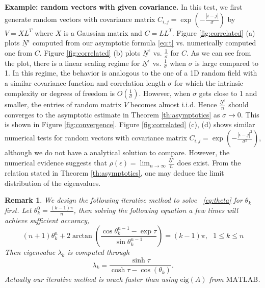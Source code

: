 \documentclass[11pt]{amsart}
\newtheorem{remark}{Remark}[section]
\newcommand{\uNe}{\underline{N}^{\epsilon}}
\begin{document}
{\bf Example: random vectors with given covariance.} In this test, we first generate random vectors with covariance matrix $C_{i,j}=\exp(-\frac{|i-j|}{\sigma})$ by $V=XL^T$ where $X$ is a Gaussian matrix and $C=LL^T$. Figure \ref{fig:correlated} (a) plots  $\underline{N}^{\epsilon}$ computed from our asymptotic formula \eqref{eq:t} vs. numerically computed one from $C$. Figure \ref{fig:correlated} (b) plots $\underline{N}^{\epsilon}$ vs. $\frac{1}{\sigma}$ for $C$.  As we can see from the plot, there is a linear scaling regime for $\underline{N}^{\epsilon}$ vs. $\frac{1}{\sigma}$ when $\sigma$ is large compared to 1. In this regime, the behavior is analogous to the one of a 1D random field with a similar covariance function and correlation length $\sigma$ for which the intrinsic complexity or degrees of freedom is $O(\frac{1}{\sigma})$. However, when $\sigma$ gets close to 1 and smaller, the entries of random matrix $V$ becomes almost i.i.d. Hence $\frac{\underline{N}^{\epsilon}}{n}$ should converges to 
the asymptotic estimate in Theorem \ref{th:asymptotics} as $\sigma\rightarrow 0$. This is shown in Figure \ref{fig:convergence}.  Figure \ref{fig:correlated} (c), (d) shows similar numerical tests for random vectors with covariance matrix $C_{i,j}=\exp(-\frac{|i-j|^2}{\sigma^2})$, although we do not have a analytical solution to compare. However, the numerical evidence suggests that $\rho(\epsilon)=\lim_{n\rightarrow \infty}\frac{\uNe}{n}$  does exist. From the relation stated in Theorem \ref{th:asymptotics}, one may deduce the limit distribution of the eigenvalues. 

\begin{remark}
We design the following iterative method to solve ~\eqref{eq:theta} for $\theta_k$ first. Let $\theta^0_k = \frac{(k-1)\pi}{n}$, then solving the following equation a few times will achieve sufficient accuracy,
	\begin{equation}
	(n+1)\theta^{n}_k + 2\arctan\left(\frac{\cos\theta^{n-1}_k - \exp\tau}{\sin\theta^{n-1}_k}\right) = (k-1)\pi,~~~1\le k\le n
	\end{equation}
	Then eigenvalue $\lambda_k$ is computed through
\[
	\lambda_k = \frac{\sinh\tau}{\cosh\tau - \cos(\theta_k)}.
\]
Actually our iterative method is much faster than using $\text{eig}(A)$ from $\text{MATLAB}$. 
\end{remark}
\end{document}
